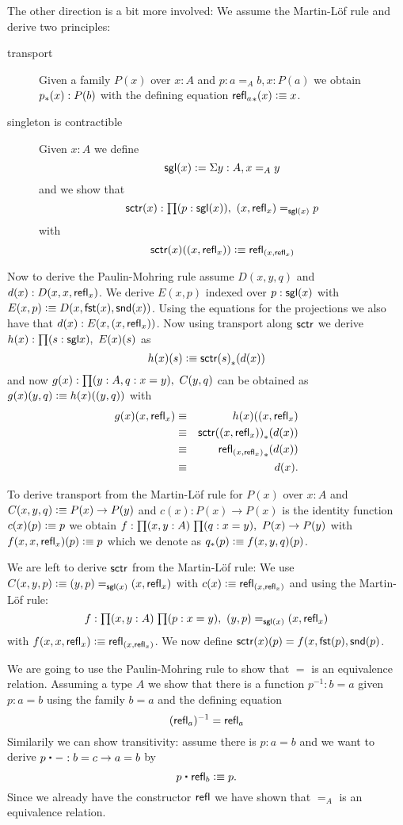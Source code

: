 The other direction is a bit more involved: We assume the Martin-L\"of
rule and derive two principles:
\begin{description}
\item[transport] Given a family $P(x)$ over
$x:A$ and $p : a =_A b, x : P(a)$ we obtain ${p}_{*}({x}) : P(b)$ with
the defining equation ${\mathsf{refl}_{a}}_{*}({x}) \vcentcolon\equiv x$.
\item[singleton is contractible]  Given $x:A$ we define 
\[ \mathsf{sgl}(x) := \Sigma y:A, x =_A y \]
and we show that 
\[\sctr(x) : \prd{p : \sgl(x)} (x,\refl{x}) =_{\sgl(x)}  p \]
with
\[ \mathsf{sctr}(x)(( x,\mathsf{refl}_{x})) \vcentcolon\equiv \mathsf{refl}_{( x,\mathsf{refl}_{x})} \]
\end{description}
Now to derive the Paulin-Mohring rule assume $D(x,y,q)$ and
$d(x):D(x,x,\mathsf{refl}_{x})$. We derive $E(x,p)$ indexed over $p:\mathsf{sgl}(x)$
with $E(x,p) \vcentcolon\equiv D(x,\mathsf{fst}(x),\mathsf{snd}(x))$. Using the equations for
the projections we also have that $d(x) : E(x,( x,\mathsf{refl}_{x}))$.
Now using transport along $\mathsf{sctr}$ we derive 
$h(x) : \prd{s : \sgl{x}}E(x)(s)$ as 
\[h(x)(s) \defeq \trans{\sctr(s)}{d(x)}\]
and now $g(x):\prd{y:A,q:x = y}C(y,q)$ can be obtained as
$g(x)(y,q) \vcentcolon\equiv h(x)(( y,q))$ with 
\begin{eqnarray*}
g(x)(x , \mathsf{refl}_{x}) & \equiv & h(x)(( x,\mathsf{refl}_{x}) \\
& \equiv & {\mathsf{sctr}(( x,\mathsf{refl}_{x}))}_{*}({d(x)})\\
& \equiv & {\mathsf{refl}_{( x,\mathsf{refl}_{x})}}_{*}({d(x)})\\
& \equiv & d(x).
\end{eqnarray*}

To derive transport from the Martin-L\"of rule for $P(x)$ over
$x:A$ and $C(x,y,q)\vcentcolon\equiv P(x) \to P(y)$ and $c(x) : P(x) \to P(x)$ is
the identity function $c(x)(p) \vcentcolon\equiv p$ we obtain 
$f : \prd{x,y:A}{q : x = y} P(x) \to P(y)$ with
$f (x,x,\mathsf{refl}_{x})(p) \vcentcolon\equiv p$ which we denote as 
${q}_{*}({p}) \vcentcolon\equiv f(x,y,q)(p)$.

We are left to derive $\mathsf{sctr}$ from the Martin-L\"of rule:
We use $C(x,y,p) \vcentcolon\equiv ( y,p) =_{\mathsf{sgl}(x)} ( x,\mathsf{refl}_{x})$
with $c(x) \vcentcolon\equiv \mathsf{refl}_{( x,\mathsf{refl}_{x})}$ and using the Martin-L\"of
  rule: 
\[f : \prd{x,y:A}{p:x = y} \tup{y}{p} =_{\sgl(x)} \tup{x}{\refl{x}}\]
 with $f(x,x,\mathsf{refl}_{x}) \vcentcolon\equiv \mathsf{refl}_{( x,\mathsf{refl}_{x})}$. We now define
$\mathsf{sctr}(x)(p) = f(x,\mathsf{fst}(p),\mathsf{snd}(p)$.

We are going to use the Paulin-Mohring rule to show that $=$ is an
equivalence relation. Assuming a type $A$ we show that there is a function
$p^{-1} : b = a$ given $p : a = b$ using the family $b = a$ and
the defining equation
\[ (\mathsf{refl}_{a})^{-1} = \mathsf{refl}_{a} \]
Similarily we can show transitivity: assume there is $p : a = b$ and
we want to derive $p \ct - : b = c \to a = b$ by
\[ p \ct \refl{b} \defeq p.\]
Since we already have the constructor $\mathsf{refl}_{}$ we have shown that $=_A$
is an equivalence relation. 

